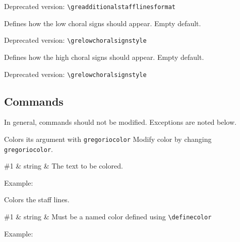 \smallskip\hspace{15pt} Deprecated version: \verb=\greadditionalstafflinesformat=

Defines how the low choral signs should appear.  Empty default.

\smallskip\hspace{15pt} Deprecated version: \verb=\grelowchoralsignstyle=

Defines how the high choral signs should appear.  Empty default.

\smallskip\hspace{15pt} Deprecated version: \verb=\grelowchoralsignstyle=

\subsection{Commands}

In general, commands should not be modified.  Exceptions are noted below.

Colors its argument with \verb=gregoriocolor= Modify color by changing
\verb=gregoriocolor=.

\begin{argtable}
  \#1 & string & The text to be colored. \\
\end{argtable}

Example:\par\medskip
\begin{latexcode}
\end{latexcode}

Colors the staff lines.

\begin{argtable}
  \#1 & string & Must be a named color defined using \verb=\definecolor= \\
\end{argtable}

Example:\par\medskip
\begin{latexcode}
\end{latexcode}

